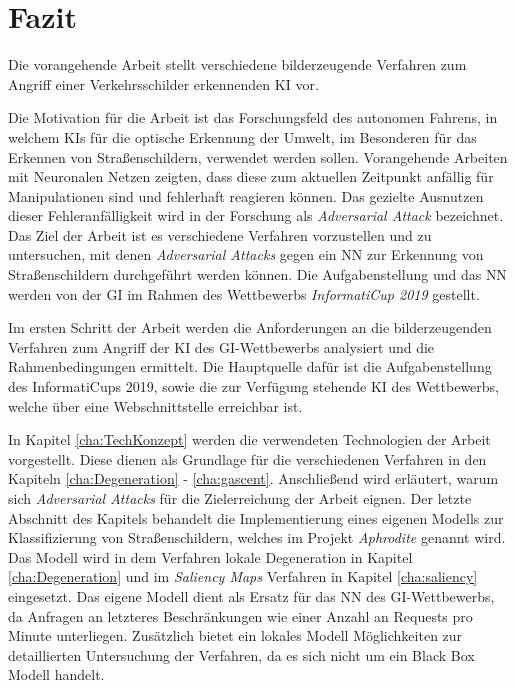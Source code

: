 \chapter{Fazit}
\label{cha:Fazit} \label{cha:Schluss}
Die vorangehende Arbeit stellt verschiedene bilderzeugende Verfahren zum Angriff einer Verkehrsschilder erkennenden \ac{KI} vor.

Die Motivation für die Arbeit ist das Forschungsfeld des autonomen Fahrens, in welchem \acp{KI} für die optische Erkennung der Umwelt, im Besonderen für das Erkennen von Straßenschildern, verwendet werden sollen. Vorangehende Arbeiten mit Neuronalen Netzen zeigten, dass diese zum aktuellen Zeitpunkt anfällig für Manipulationen sind und fehlerhaft reagieren können. Das gezielte Ausnutzen dieser Fehleranfälligkeit wird in der Forschung als \textit{Adversarial Attack} bezeichnet. Das Ziel der Arbeit ist es verschiedene Verfahren vorzustellen und zu untersuchen, mit denen \textit{Adversarial Attacks} gegen ein \ac{NN} zur Erkennung von Straßenschildern durchgeführt werden können. Die Aufgabenstellung und das \ac{NN} werden von der \acl{GI} im Rahmen des Wettbewerbs \textit{InformatiCup 2019} gestellt.

Im ersten Schritt der Arbeit werden die Anforderungen an die bilderzeugenden Verfahren zum Angriff der \ac{KI} des \ac{GI}-Wettbewerbs analysiert und die Rahmenbedingungen ermittelt. Die Hauptquelle dafür ist die Aufgabenstellung des InformatiCups 2019, sowie die zur Verfügung stehende \ac{KI} des Wettbewerbs, welche über eine Webschnittstelle erreichbar ist.

In Kapitel \ref{cha:TechKonzept} werden die verwendeten Technologien der Arbeit vorgestellt. Diese dienen als Grundlage für die verschiedenen Verfahren in den Kapiteln \ref{cha:Degeneration} - \ref{cha:gascent}. Anschließend wird erläutert, warum sich \textit{Adversarial Attacks} für die Zielerreichung der Arbeit eignen. Der letzte Abschnitt des Kapitels behandelt die Implementierung eines eigenen Modells zur Klassifizierung von Straßenschildern, welches im Projekt \textit{Aphrodite} genannt wird. Das Modell wird in dem Verfahren lokale Degeneration in Kapitel \ref{cha:Degeneration} und im \textit{Saliency Maps} Verfahren in Kapitel \ref{cha:saliency} eingesetzt. Das eigene Modell dient als Ersatz für das \ac{NN} des \ac{GI}-Wettbewerbs, da Anfragen an letzteres Beschränkungen wie einer Anzahl an Requests pro Minute unterliegen. Zusätzlich bietet ein lokales Modell Möglichkeiten zur detaillierten Untersuchung der Verfahren, da es sich nicht um ein Black Box Modell handelt.
 
